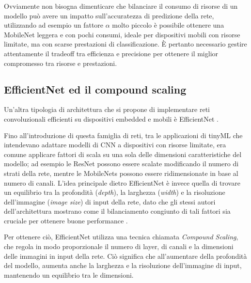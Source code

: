 
Ovviamente non bisogna dimenticare che bilanciare il consumo di risorse di un modello può avere un impatto sull'accuratezza di predizione della rete, utilizzando ad esempio un fattore $\alpha$ molto piccolo è possibile ottenere una MobileNet leggera e con pochi consumi, ideale per dispositivi mobili con risorse limitate, ma con scarse prestazioni di classificazione. È pertanto necessario gestire attentamente il tradeoff tra efficienza e precisione per ottenere il miglior compromesso tra risorse e prestazioni.

\subsection{EfficientNet ed il compound scaling}

Un'altra tipologia di architettura che si propone di implementare reti convoluzionali efficienti su dispositivi embedded e mobili è EfficientNet \cite{EfficientNet}.

Fino all'introduzione di questa famiglia di reti, tra le applicazioni di tinyML che intendevano adattare modelli di CNN a dispositivi con risorse limitate, era comune applicare fattori di scala su una sola delle dimensioni caratteristiche del modello; ad esempio le ResNet \cite{ResNet} possono essere scalate modificando il numero di strati della rete, mentre le MobileNets possono essere ridimensionate in base al numero di canali.
L'idea principale dietro EfficientNet è invece quella di trovare un equilibrio tra la profondità (\textit{depth}), la larghezza (\textit{width}) e la risoluzione dell'immagine (\textit{image size}) di input della rete, dato che gli stessi autori dell'architettura mostrano come il bilanciamento congiunto di tali fattori sia cruciale per ottenere buone performance \cite{EfficientNet}. 

Per ottenere ciò, EfficientNet utilizza una tecnica chiamata \textit{Compound Scaling}, che regola in modo proporzionale il numero di layer, di canali e la dimensioni delle immagini in input della rete. Ciò significa che all'aumentare della profondità del modello, aumenta anche la larghezza e la risoluzione dell'immagine di input, mantenendo un equilibrio tra le dimensioni.


